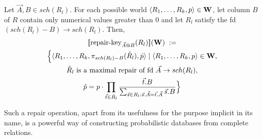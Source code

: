 \begin{itemize}
Let $\vec{A}, B \in sch(R_l)$.
For each possible world $\langle R_1, \dots, R_k, p \rangle \in {\bf W}$,
let column $B$ of $R$ contain only numerical values greater than 0
and
let $R_l$ satisfy the fd $(sch(R_l) - B) \rightarrow sch(R_l)$.
Then,
\begin{multline*}
\lbrack\!\lbrack\mbox{repair-key}_{\vec{A}@B}(R_l)\rbrack\!\rbrack({\bf W}) \; := \\
\Big\{
\langle R_1, \dots, R_k, \pi_{sch(R_l)-B}(\hat{R}_l), \hat{p} \rangle
\mid
\langle R_1, \dots, R_k, p \rangle \in {\bf W},
\\
\mbox{$\hat{R}_l$ is a maximal repair of fd $\vec{A} \rightarrow sch(R_l)$},
\\
\hat{p} = p \cdot \prod_{\vec{t} \in \hat{R}_l}
  \frac{\vec{t}.B}
       {\sum_{\vec{s} \in R_l: \vec{s}.\vec{A}=\vec{t}.\vec{A}} \vec{s}.B}
\Big\}
\end{multline*}

Such a repair operation, apart from its usefulness for the purpose implicit
in its name, is a powerful way of constructing probabilistic databases from
complete relations.



\end{itemize}
